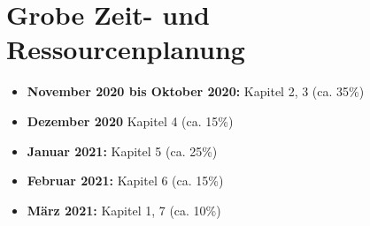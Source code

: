 \chapter{Grobe Zeit- und Ressourcenplanung}

\begin{itemize}
    \item \textbf{November 2020 bis Oktober 2020:} Kapitel 2, 3 (ca. 35\%)
    \item \textbf{Dezember 2020} Kapitel 4 (ca. 15\%)
    \item \textbf{Januar 2021:} Kapitel 5 (ca. 25\%)
    \item \textbf{Februar 2021:} Kapitel 6 (ca. 15\%)
    \item \textbf{März 2021:} Kapitel 1, 7 (ca. 10\%)
\end{itemize}













